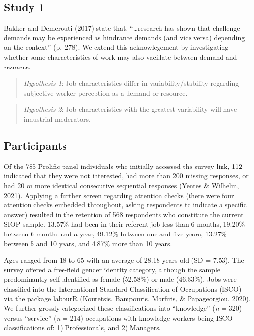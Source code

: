 \documentclass[
  english,
  man]{apa6}
\begin{document}
\hypertarget{study-1}{%
\subsection{Study 1}\label{study-1}}

Bakker and Demerouti (2017) state that, \enquote{\ldots research has shown that challenge demands may be experienced as hindrance demands (and vice versa) depending on the context} (p.~278). We extend this acknowlegement by investigating whether some characteristics of work may also vacillate between demand and \emph{resource}.

\begin{quote}
\emph{Hypothesis 1}: Job characteristics differ in variability/stability regarding subjective worker perception as a demand or resource.
\end{quote}

\begin{quote}
\emph{Hypothesis 2}: Job characteristics with the greatest variability will have industrial moderators.
\end{quote}

\hypertarget{participants}{%
\subsection{Participants}\label{participants}}

Of the 785 Prolific panel individuals who initially accessed the survey link, 112 indicated that they were not interested, had more than 200 missing responses, or had 20 or more identical consecutive sequential responses (Yentes \& Wilhelm, 2021). Applying a further screen regarding attention checks (there were four attention checks embedded throughout, asking respondents to indicate a specific answer) resulted in the retention of 568 respondents who constitute the current SIOP sample. 13.57\% had been in their referent job less than 6 months, 19.20\% between 6 months and a year, 49.12\% between one and five years, 13.27\% between 5 and 10 years, and 4.87\% more than 10 years.

Ages ranged from 18 to 65 with an average of 28.18 years old (SD = 7.53). The survey offered a free-field gender identity category, although the sample predominantly self-identified as female (52.58\%) or male (46.83\%). Jobs were classified into the International Standard Classification of Occupations (ISCO) via the package labourR (Kouretsis, Bampouris, Morfiris, \& Papageorgiou, 2020). We further grossly categorized these classifications into \enquote{knowledge} (\emph{n} = 320) versus \enquote{service} (\emph{n} = 214) occupations with knowledge workers being ISCO classifications of: 1) Professionals, and 2) Managers.
\end{document}
